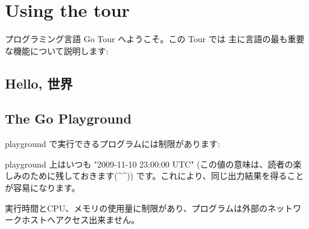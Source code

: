 \section{Using the tour}

プログラミング言語 Go Tour へようこそ。この Tour では
主に言語の最も重要な機能について説明します:

\subsection{Hello, 世界}




\subsection{The Go Playground}

playground で実行できるプログラムには制限があります:

playground 上はいつも "2009-11-10 23:00:00 UTC" 
(この値の意味は、読者の楽しみのために残しておきます(\textasciicircum \textasciicircum))
です。これにより、同じ出力結果を得ることが容易になります。

実行時間とCPU、メモリの使用量に制限があり、プログラムは外部のネットワークホストへアクセス出来ません。


\newpage


